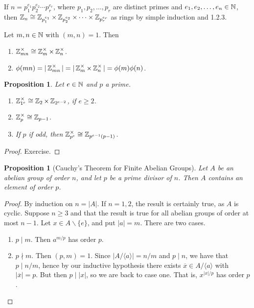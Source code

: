 \documentclass[11pt]{book}
\newcounter{counter}
\newtheorem{proposition}[counter]{Proposition}   \newtheorem{problem}[counter]{Problem}   \newtheorem*{proposition*}{Proposition}   \newtheorem*{lemma*}{Lemma}
\theoremstyle{definition}   \newtheorem{defn}[counter]{Definition} %
\newcommand{\ov}{\overline}   \newcommand{\wt}{\widetilde}
\newcommand{\bs}{\backslash}   \newcommand{\A}{\mathcal{A}}   \newcommand{\sy}{\textnormal{Syl}}   \newcommand{\size}[1]{\left| #1 \right|}
\newcommand{\gen}[1]{\langle #1 \rangle}   \newcommand{\stab}[2]{\tn{Stab}_{#1}(#2)}   \newcommand{\fix}[2]{\tn{Fix}_{#1}(#2)}
\newcommand{\vs}{\vspace{8pt}}
\numberwithin{counter}{chapter}
\begin{document}
\vs

\begin{consequence*}
If $n = p_1^{e_1} p_2^{e_2} \cdots p_r^{e_r}$, where $p_1,p_2,\dots,p_r$ are distinct primes and $e_1,e_2,\dots,e_n \in \operatorname{\mathbb{N}}$, then $\operatorname{\mathbb{Z}}_n \cong \operatorname{\mathbb{Z}}_{p_1^{e_1}} \times \operatorname{\mathbb{Z}}_{p_2^{e_2}} \times \dots \times \operatorname{\mathbb{Z}}_{p_r^{e_r}}$ as rings by simple induction and 1.2.3.
\end{consequence*}

\vs

\begin{corollary}
Let $m,n \in \operatorname{\mathbb{N}}$ with $(m,n) = 1$. Then
	\begin{enumerate}
	\item[(a)] $\operatorname{\mathbb{Z}}_{mn}^{\times} \cong \operatorname{\mathbb{Z}}_m^{\times} \times \operatorname{\mathbb{Z}}_n^{\times}$.
	\item[(b)] $\phi(mn) = |\operatorname{\mathbb{Z}}_{mn}^{\times}| = |\operatorname{\mathbb{Z}}_m^{\times} \times \operatorname{\mathbb{Z}}_n^{\times}| = \phi(m) \phi(n)$.
	\end{enumerate}
\end{corollary}

\vs

\begin{proposition}
Let $e \in \operatorname{\mathbb{N}}$ and $p$ a prime.
	\begin{enumerate}
	\item[(a)] $\operatorname{\mathbb{Z}}_{1^e}^{\times} \cong \operatorname{\mathbb{Z}}_2 \times \operatorname{\mathbb{Z}}_{2^{e-2}}$, if $e \geq 2$.
	\item[(b)] $\operatorname{\mathbb{Z}}_p^{\times} \cong \operatorname{\mathbb{Z}}_{p-1}$.
	\item[(c)] If $p$ if odd, then $\operatorname{\mathbb{Z}}_{p^e}^{\times} \cong \operatorname{\mathbb{Z}}_{p^{e-1}(p-1)}$.
	\end{enumerate}
\end{proposition}

\begin{proof}
Exercise.
\end{proof}

\vs

\begin{proposition}[Cauchy's Theorem for Finite Abelian Groups]
Let $A$ be an abelian group of order $n$, and let $p$ be a prime divisor of $n$. Then $A$ contains an element of order $p$.
\end{proposition}

\begin{proof}
By induction on $n = |A|$. If $n = 1,2$, the result is certainly true, as $A$ is cyclic. Suppose $n \geq 3$ and that the result is true for all abelian groups of order at most $n-1$. Let $x \in A \bs\{e\}$, and put $|a| = m$. There are two cases.
	\begin{enumerate}
	\item[1. ] $p \mid m$. Then $a^{m/p}$ has order $p$.
	\item[2. ] $p \nmid m$. Then $(p,m) = 1$. Since $|A/\gen{a}| = n/m$ and $p \mid n$, we have that $p \mid n/m$, hence by our inductive hypothesis  there exists $\ov{x} \in A/ \gen{a}$ with $|\ov{x}| = p$. But then $p \mid |x|$, so we are back to case one. That is, $x^{|x|/p}$ has order $p$.
	\end{enumerate}
\end{proof}
\end{document}
